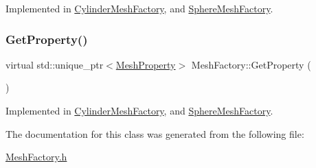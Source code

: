 Implemented in \mbox{\hyperlink{class_cylinder_mesh_factory_a6693199a1ec7dc082b56be29213b97d2}{Cylinder\+Mesh\+Factory}}, and \mbox{\hyperlink{class_sphere_mesh_factory_a1af7ab44a55adea946466d4729cb2b52}{Sphere\+Mesh\+Factory}}.

\mbox{\label{class_mesh_factory_abff50d215458843dd98271ab803a7671}} 
\subsubsection{\texorpdfstring{GetProperty()}{GetProperty()}}
{\footnotesize\ttfamily virtual std\+::unique\+\_\+ptr$<$\mbox{\hyperlink{class_mesh_property}{Mesh\+Property}}$>$ Mesh\+Factory\+::\+Get\+Property (\begin{DoxyParamCaption}{ }\end{DoxyParamCaption})\hspace{0.3cm}{\ttfamily [pure virtual]}}



Implemented in \mbox{\hyperlink{class_cylinder_mesh_factory_a3fa17fc0e14db4007c9c2a6cdeb1d8fa}{Cylinder\+Mesh\+Factory}}, and \mbox{\hyperlink{class_sphere_mesh_factory_af19b3922356cc71d20213556b0eb98a6}{Sphere\+Mesh\+Factory}}.



The documentation for this class was generated from the following file\+:\begin{DoxyCompactItemize}
\item 
\mbox{\hyperlink{_mesh_factory_8h}{Mesh\+Factory.\+h}}\end{DoxyCompactItemize}
